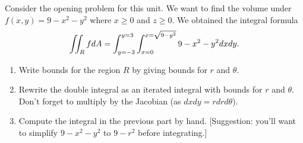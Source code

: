 \begin{problem}%
Consider the opening problem for this unit.  We want to find the volume under $f(x,y)=9-x^2-y^2$ where $x\geq0$ and $z\geq 0$.  We obtained the integral formula 
$$\iint_R f dA = \displaystyle\int_{y=-3}^{y=3} \int_{x=0}^{x=\sqrt{9-y^2}}9-x^2-y^2 dx dy.$$
\begin{enumerate}
 \item Write bounds for the region $R$ by giving bounds for $r$ and $\theta$.
 \item Rewrite the double integral as an iterated integral with bounds for $r$ and $\theta$. Don't forget to multiply by the Jacobian (as $dxdy=rdrd\theta$). 
 \item Compute the integral in the previous part by hand. [Suggestion: you'll want to simplify $9-x^2-y^2$ to $9-r^2$ before integrating.]
\end{enumerate}
\end{problem}


